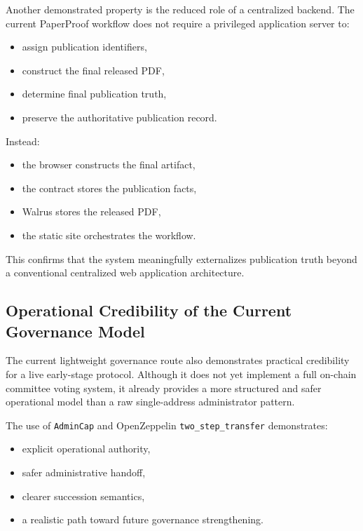 \documentclass[journal]{IEEEtran}
\begin{document}
Another demonstrated property is the reduced role of a centralized backend. The current PaperProof workflow does not require a privileged application server to:

\begin{itemize}
    \item assign publication identifiers,
    \item construct the final released PDF,
    \item determine final publication truth,
    \item preserve the authoritative publication record.
\end{itemize}

Instead:
\begin{itemize}
    \item the browser constructs the final artifact,
    \item the contract stores the publication facts,
    \item Walrus stores the released PDF,
    \item the static site orchestrates the workflow.
\end{itemize}


This confirms that the system meaningfully externalizes publication truth beyond a conventional centralized web application architecture.

\subsection{Operational Credibility of the Current Governance Model}

The current lightweight governance route also demonstrates practical credibility for a live early-stage protocol. Although it does not yet implement a full on-chain committee voting system, it already provides a more structured and safer operational model than a raw single-address administrator pattern.

The use of \texttt{AdminCap} and OpenZeppelin \texttt{two\_step\_transfer} demonstrates:
\begin{itemize}
    \item explicit operational authority,
    \item safer administrative handoff,
    \item clearer succession semantics,
    \item a realistic path toward future governance strengthening.
\end{itemize}
\end{document}

